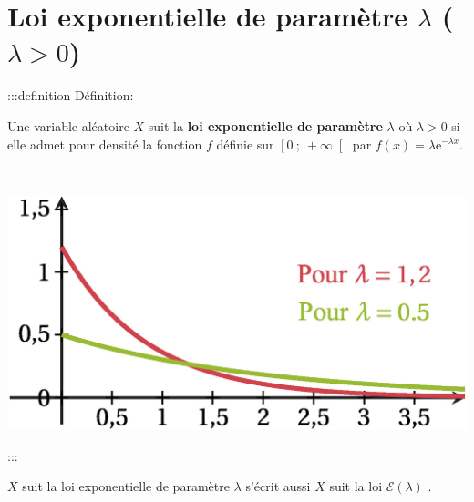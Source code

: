 \documentclass{cornouaille}
\begin{document}
\newpage


\section{Loi exponentielle de paramètre $\lambda$ ($\lambda>0$)}



:::definition Définition: 



\begin{minipage}{0.5\linewidth}
Une variable aléatoire $X$ suit la \textbf{loi exponentielle de paramètre}{} $\lambda$ où $\lambda>0$ si elle admet pour densité la fonction $f$ définie sur $\left[0\ ;\ +\infty \right[$ par $f(x)=\lambda\textrm{e}^{-\lambda x}$.
\vfill

~~
\end{minipage}

\hfill

\begin{minipage}{0.5\linewidth}



\includegraphics{./TS-Variables-3}



\end{minipage}



:::



\begin{remarque}
\og $X$ suit la loi exponentielle de paramètre $\lambda$ \fg{} s'écrit aussi \og $X$ suit la loi $\mathcal{E}\left(\lambda\right)$ \fg.
\end{remarque}
\end{document}

